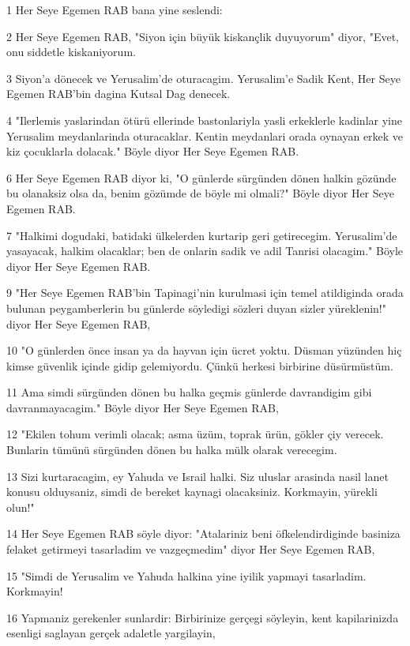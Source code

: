 \par 1 Her Seye Egemen RAB bana yine seslendi:
\par 2 Her Seye Egemen RAB, "Siyon için büyük kiskançlik duyuyorum" diyor, "Evet, onu siddetle kiskaniyorum.
\par 3 Siyon'a dönecek ve Yerusalim'de oturacagim. Yerusalim'e Sadik Kent, Her Seye Egemen RAB'bin dagina Kutsal Dag denecek.
\par 4 "Ilerlemis yaslarindan ötürü ellerinde bastonlariyla yasli erkeklerle kadinlar yine Yerusalim meydanlarinda oturacaklar. Kentin meydanlari orada oynayan erkek ve kiz çocuklarla dolacak." Böyle diyor Her Seye Egemen RAB.
\par 6 Her Seye Egemen RAB diyor ki, "O günlerde sürgünden dönen halkin gözünde bu olanaksiz olsa da, benim gözümde de böyle mi olmali?" Böyle diyor Her Seye Egemen RAB.
\par 7 "Halkimi dogudaki, batidaki ülkelerden kurtarip geri getirecegim. Yerusalim'de yasayacak, halkim olacaklar; ben de onlarin sadik ve adil Tanrisi olacagim." Böyle diyor Her Seye Egemen RAB.
\par 9 "Her Seye Egemen RAB'bin Tapinagi'nin kurulmasi için temel atildiginda orada bulunan peygamberlerin bu günlerde söyledigi sözleri duyan sizler yüreklenin!" diyor Her Seye Egemen RAB,
\par 10 "O günlerden önce insan ya da hayvan için ücret yoktu. Düsman yüzünden hiç kimse güvenlik içinde gidip gelemiyordu. Çünkü herkesi birbirine düsürmüstüm.
\par 11 Ama simdi sürgünden dönen bu halka geçmis günlerde davrandigim gibi davranmayacagim." Böyle diyor Her Seye Egemen RAB,
\par 12 "Ekilen tohum verimli olacak; asma üzüm, toprak ürün, gökler çiy verecek. Bunlarin tümünü sürgünden dönen bu halka mülk olarak verecegim.
\par 13 Sizi kurtaracagim, ey Yahuda ve Israil halki. Siz uluslar arasinda nasil lanet konusu olduysaniz, simdi de bereket kaynagi olacaksiniz. Korkmayin, yürekli olun!"
\par 14 Her Seye Egemen RAB söyle diyor: "Atalariniz beni öfkelendirdiginde basiniza felaket getirmeyi tasarladim ve vazgeçmedim" diyor Her Seye Egemen RAB,
\par 15 "Simdi de Yerusalim ve Yahuda halkina yine iyilik yapmayi tasarladim. Korkmayin!
\par 16 Yapmaniz gerekenler sunlardir: Birbirinize gerçegi söyleyin, kent kapilarinizda esenligi saglayan gerçek adaletle yargilayin,

